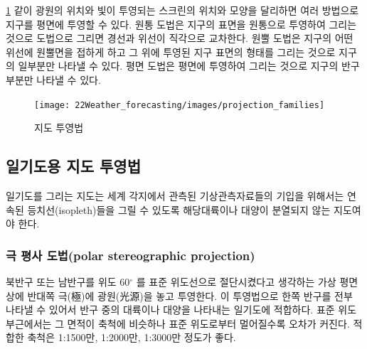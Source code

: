 

\ref{fig:map_projection} \과 같이 광원의 위치와 빛이 투영되는 스크린의 위치와 모양을 달리하면 여러 방법으로 지구를 평면에 투영할 수 있다. 원통 도법은 지구의 표면을 원통으로 투영하여 그리는 것으로 도법으로 그리면 경선과 위선이 직각으로 교차한다. 원뿔 도법은 지구의 어떤 위선에 원뿔면을 접하게 하고 그 위에 투영된 지구 표면의 형태를 그리는 것으로 지구의 일부분만 나타낼 수 있다. 평면 도법은 평면에 투영하여 그리는 것으로 지구의 반구 부분만 나타낼 수 있다.

\begin{figure}[h]
	\centering
	\texttt{[image: 22Weather\_forecasting/images/projection\_families]}
	\caption{지도 투영법}
	\label{fig:map_projection}
\end{figure}

\subsection{일기도용 지도 투영법}
일기도를 그리는 지도는 세계 각지에서 관측된 기상관측자료들의 기입을 위해서는 연속된 등치선(isopleth)들을 그릴 수 있도록 해당대륙이나 대양이 분열되지 않는 지도여야 한다.

\subsubsection{극 평사 도법(polar stereographic projection)}
북반구 또는 남반구를 위도 60$^{\circ}$ 를 표준 위도선으로 절단시켰다고 생각하는 가상 평면 상에 반대쪽 극(極)에 광원(光源)을 놓고 투영한다. 이 투영법으로 한쪽 반구를 전부 나타낼 수 있어서 반구 중의 대륙이나 대양을 나타내는 일기도에 적합하다. 표준 위도 부근에서는 그 면적이 축척에 비슷하나 표준 위도로부터 멀어질수록 오차가 커진다. 적합한 축척은 1:1500만, 1:2000만, 1:3000만 정도가 좋다.

